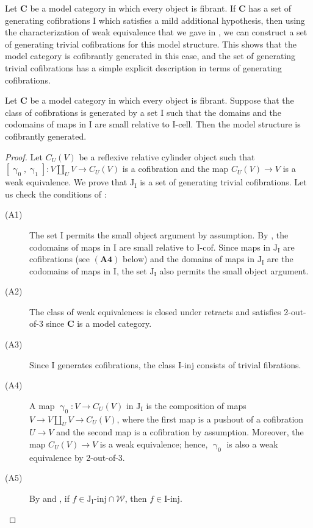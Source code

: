 \documentclass{tac}
\theoremstyle{definition}
\newcommand{\we}{\mathcal{W}}
\newcommand{\cat}[1]{\mathbf{#1}}
\newcommand{\C}{\cat{C}}
\newcommand{\I}{\mathrm{I}}
\newcommand{\J}{\mathrm{J}}
\newcommand{\class}[2]{#1\text{-}\mathrm{#2}}
\newcommand{\Iinj}[1][\I]{\class{#1}{inj}}
\newcommand{\Icell}[1][\I]{\class{#1}{cell}}
\newcommand{\Icof}[1][\I]{\class{#1}{cof}}
\newcommand{\Jinj}[1][]{\Iinj[\J#1]}
\newcommand{\cyli}{\upgamma}
\begin{document}
Let $\C$ be a model category in which every object is fibrant.
If $\C$ has a set of generating cofibrations $\I$ which satisfies a mild additional hypothesis, then using the characterization of weak equivalence that we gave in ,
we can construct a set of generating trivial cofibrations for this model structure.
This shows that the model category is cofibrantly generated in this case,
and the set of generating trivial cofibrations has a simple explicit description in terms of generating cofibrations.

\begin{prop}
Let $\C$ be a model category in which every object is fibrant.
Suppose that the class of cofibrations is generated by a set $\I$ such that
the domains and the codomains of maps in $\I$ are small relative to $\Icell$.
Then the model structure is cofibrantly generated.
\end{prop}
\begin{proof}
Let $C_U(V)$ be a reflexive relative cylinder object such that $[\cyli_0,\cyli_1] : V \amalg_U V \to C_U(V)$ is a cofibration and the map $C_U(V) \to V$ is a weak equivalence.
We prove that $\J_\I$ is a set of generating trivial cofibrations.
Let us check the conditions of :
\begin{description}
\item[(A1)] The set $\I$ permits the small object argument by assumption.
By \cite[Proposition~2.1.16]{hovey}, the codomains of maps in $\I$ are small relative to $\Icof$.
Since maps in $\J_\I$ are cofibrations (see $\mathbf{(A4)}$ below) and the domains of maps in $\J_\I$ are the codomains of maps in $\I$,
the set $\J_\I$ also permits the small object argument.
\item[(A2)] The class of weak equivalences is closed under retracts and satisfies 2-out-of-3 since $\C$ is a model category.
\item[(A3)] Since $\I$ generates cofibrations, the class $\Iinj$ consists of trivial fibrations.
\item[(A4)] A map $\cyli_0 : V \to C_U(V)$ in $\J_\I$ is the composition of maps $V \to V \amalg_U V \to C_U(V)$,
where the first map is a pushout of a cofibration $U \to V$ and the second map is a cofibration by assumption.
Moreover, the map $C_U(V) \to V$ is a weak equivalence; hence, $\cyli_0$ is also a weak equivalence by 2-out-of-3.
\item[(A5)] By  and , if $f \in \Jinj[_\I] \cap \we$, then $f \in \Iinj$.
\end{description}
\end{proof}
\end{document}
